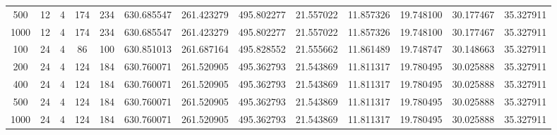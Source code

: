 \begin{table}[h]
\begin{tabular}{ccccccccccccc}
500 & 12 & 4 & 174 & 234 & 630.685547 & 261.423279 & 495.802277 & 21.557022 & 11.857326 & 19.748100 & 30.177467 & 35.327911 \\
1000 & 12 & 4 & 174 & 234 & 630.685547 & 261.423279 & 495.802277 & 21.557022 & 11.857326 & 19.748100 & 30.177467 & 35.327911 \\
100 & 24 & 4 & 86 & 100 & 630.851013 & 261.687164 & 495.828552 & 21.555662 & 11.861489 & 19.748747 & 30.148663 & 35.327911 \\
200 & 24 & 4 & 124 & 184 & 630.760071 & 261.520905 & 495.362793 & 21.543869 & 11.811317 & 19.780495 & 30.025888 & 35.327911 \\
400 & 24 & 4 & 124 & 184 & 630.760071 & 261.520905 & 495.362793 & 21.543869 & 11.811317 & 19.780495 & 30.025888 & 35.327911 \\
500 & 24 & 4 & 124 & 184 & 630.760071 & 261.520905 & 495.362793 & 21.543869 & 11.811317 & 19.780495 & 30.025888 & 35.327911 \\
1000 & 24 & 4 & 124 & 184 & 630.760071 & 261.520905 & 495.362793 & 21.543869 & 11.811317 & 19.780495 & 30.025888 & 35.327911 \\
\bottomrule
\end{tabular}
\end{table}

